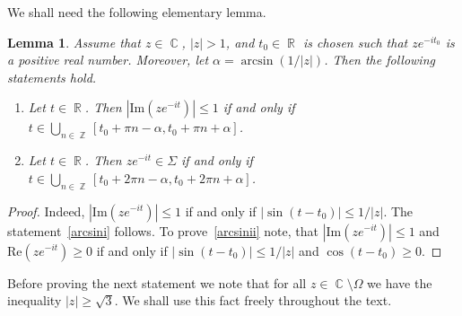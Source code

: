 \documentclass{amsart}
\numberwithin{equation}{section}
\newtheorem{lemma}[theorem]{Lemma}
\theoremstyle{definition}
\theoremstyle{remark}
\DeclareMathOperator{\CC}{\mathbb C}
\DeclareMathOperator{\RR}{\mathbb R}
\DeclareMathOperator{\ZZ}{\mathbb Z}
\begin{document}
	We shall need the following elementary lemma.
	\begin{lemma}\label{lemArcsin}
		Assume that $z \in \CC$, $|z| > 1$, and $t_0 \in \RR$ is chosen such that $z e^{-it_0}$ is a positive real number. Moreover, let $\alpha = \arcsin(1/|z|)$. Then the following statements hold.
		\begin{enumerate}[label=(\roman*)]
			\item\label{arcsini} Let $t \in \RR$.  Then $|\mathrm{Im}(ze^{-it})| \le 1$ if and only if $t \in \bigcup\limits_{n \in \ZZ} [t_0 + \pi n - \alpha, t_0 + \pi n + \alpha]$.
			\item\label{arcsinii} Let $t \in \RR$.  Then $ze^{-it} \in \Sigma$ if and only if $t \in \bigcup\limits_{n \in \ZZ} [t_0 + 2\pi n - \alpha, t_0 + 2\pi n + \alpha]$.
		\end{enumerate}
	\end{lemma}
	\begin{proof}
		Indeed, $|\mathrm{Im}(ze^{-it})| \le 1$ if and only if $|\sin(t - t_0)| \le 1/|z|$. The statement~\ref{arcsini} follows. To prove~\ref{arcsinii} note, that $|\mathrm{Im}(ze^{-it})| \le 1$ and $\mathrm{Re}(ze^{-it}) \ge 0$ if and only if $|\sin(t - t_0)| \le 1/|z|$ and $\cos(t - t_0) \ge 0$.
	\end{proof}

	Before proving the next statement we note that for all $z \in \CC \setminus \Omega$ we have the inequality $|z| \ge \sqrt{3}$. We shall use this fact freely throughout the text.
	
\end{document}

